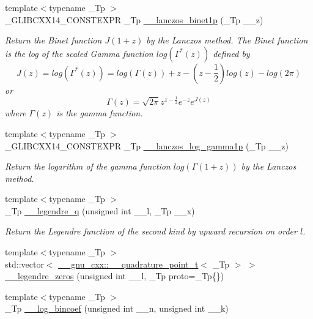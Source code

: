 \begin{DoxyCompactItemize}
{\footnotesize template$<$typename \+\_\+\+Tp $>$ }\\\+\_\+\+G\+L\+I\+B\+C\+X\+X14\+\_\+\+C\+O\+N\+S\+T\+E\+X\+PR \+\_\+\+Tp \hyperlink{namespacestd_1_1____detail_a84722b82d6d614aa4653eb7559f7d508}{\+\_\+\+\_\+lanczos\+\_\+binet1p} (\+\_\+\+Tp \+\_\+\+\_\+z)
\begin{DoxyCompactList}\small\item\em Return the Binet function $ J(1+z) $ by the Lanczos method. The Binet function is the log of the scaled Gamma function $ log(\Gamma^*(z)) $ defined by \[ J(z) = log(\Gamma^*(z)) = log\left(\Gamma(z)\right) + z - \left(z-\frac{1}{2}\right) log(z) - log(2\pi) \] or \[ \Gamma(z) = \sqrt{2\pi}z^{z-\frac{1}{2}}e^{-z}e^{J(z)} \] where $ \Gamma(z) $ is the gamma function. \end{DoxyCompactList}\item 
{\footnotesize template$<$typename \+\_\+\+Tp $>$ }\\\+\_\+\+G\+L\+I\+B\+C\+X\+X14\+\_\+\+C\+O\+N\+S\+T\+E\+X\+PR \+\_\+\+Tp \hyperlink{namespacestd_1_1____detail_a4586aeea80ba556ab8d6393dadb05c5c}{\+\_\+\+\_\+lanczos\+\_\+log\+\_\+gamma1p} (\+\_\+\+Tp \+\_\+\+\_\+z)
\begin{DoxyCompactList}\small\item\em Return the logarithm of the gamma function $ log(\Gamma(1+z)) $ by the Lanczos method. \end{DoxyCompactList}\item 
{\footnotesize template$<$typename \+\_\+\+Tp $>$ }\\\+\_\+\+Tp \hyperlink{namespacestd_1_1____detail_a0643760e0d1701df4db880b2ad969055}{\+\_\+\+\_\+legendre\+\_\+q} (unsigned int \+\_\+\+\_\+l, \+\_\+\+Tp \+\_\+\+\_\+x)
\begin{DoxyCompactList}\small\item\em Return the Legendre function of the second kind by upward recursion on order $ l $. \end{DoxyCompactList}\item 
{\footnotesize template$<$typename \+\_\+\+Tp $>$ }\\std\+::vector$<$ \hyperlink{struct____gnu__cxx_1_1____quadrature__point__t}{\+\_\+\+\_\+gnu\+\_\+cxx\+::\+\_\+\+\_\+quadrature\+\_\+point\+\_\+t}$<$ \+\_\+\+Tp $>$ $>$ \hyperlink{namespacestd_1_1____detail_a9d53ac0fd39232190e7564fa067a878d}{\+\_\+\+\_\+legendre\+\_\+zeros} (unsigned int \+\_\+\+\_\+l, \+\_\+\+Tp proto=\+\_\+\+Tp\{\})
\item 
{\footnotesize template$<$typename \+\_\+\+Tp $>$ }\\\+\_\+\+Tp \hyperlink{namespacestd_1_1____detail_a152324942f37ae3c6fc65aec1f17049e}{\+\_\+\+\_\+log\+\_\+bincoef} (unsigned int \+\_\+\+\_\+n, unsigned int \+\_\+\+\_\+k)

\end{DoxyCompactItemize}
